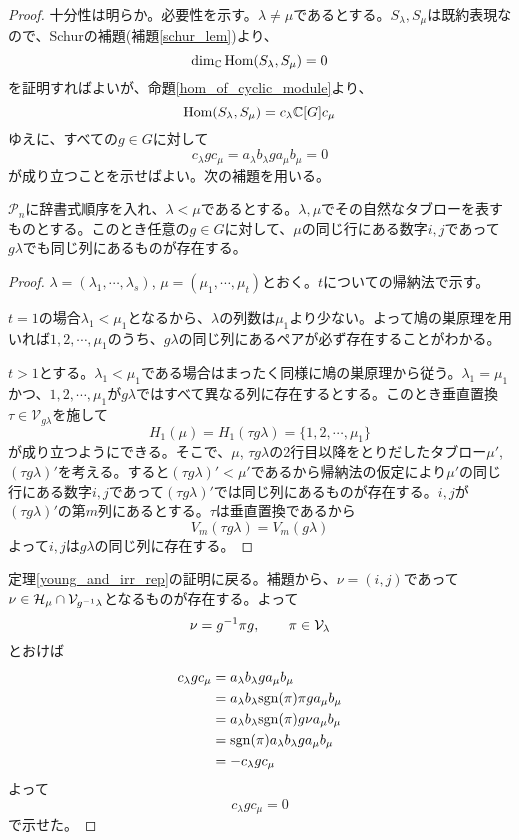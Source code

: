 \documentclass{ltjsreport}
\begin{document}
\begin{proof}
  十分性は明らか。必要性を示す。$\lambda\neq\mu$であるとする。$S_\lambda, S_\mu$は既約表現なので、Schurの補題(補題\ref{schur_lem})より、
  \[
  \dim_{\mathbb{C}}\text{Hom}(S_\lambda,S_\mu)=0  
  \]
  を証明すればよいが、命題\ref{hom_of_cyclic_module}より、
  \[
  \text{Hom}(S_\lambda,S_\mu)=c_\lambda\mathbb{C}[G]c_\mu
  \]
  ゆえに、すべての$g\in G$に対して
  \[
  c_\lambda gc_\mu  =a_\lambda b_\lambda g a_\mu b_\mu = 0
  \]
  が成り立つことを示せばよい。次の補題を用いる。
  \begin{lemm}\label{lexicographical}
    $\mathcal{P}_n$に辞書式順序を入れ、$\lambda < \mu$であるとする。$\lambda, \mu$でその自然なタブローを表すものとする。このとき任意の$g\in G$に対して、$\mu$の同じ行にある数字$i,j$であって$g\lambda$でも同じ列にあるものが存在する。
  \end{lemm}

  \begin{proof}
    $\lambda=(\lambda_1,\cdots,\lambda_s)$, $\mu=(\mu_1,\cdots,\mu_t)$とおく。$t$についての帰納法で示す。

    $t=1$の場合$\lambda_1<\mu_1$となるから、$\lambda$の列数は$\mu_1$より少ない。よって鳩の巣原理を用いれば$1,2,\cdots,\mu_1$のうち、$g\lambda$の同じ列にあるペアが必ず存在することがわかる。

    $t>1$とする。$\lambda_1<\mu_1$である場合はまったく同様に鳩の巣原理から従う。$\lambda_1=\mu_1$かつ、$1,2,\cdots,\mu_1$が$g\lambda$ではすべて異なる列に存在するとする。このとき垂直置換$\tau\in\mathcal{V}_{g\lambda}$を施して
    \[
    H_1(\mu)=H_1(\tau g\lambda)=\{1,2,\cdots,\mu_1\}  
    \]
    が成り立つようにできる。そこで、$\mu$, $\tau g\lambda$の2行目以降をとりだしたタブロー$\mu'$, $(\tau g\lambda)'$を考える。すると$(\tau g\lambda)'<\mu'$であるから帰納法の仮定により$\mu'$の同じ行にある数字$i,j$であって$(\tau g\lambda)'$では同じ列にあるものが存在する。$i,j$が$(\tau g\lambda)'$の第$m$列にあるとする。$\tau$は垂直置換であるから
    \[
    V_m(\tau g\lambda)=V_m(g\lambda)
    \]
    よって$i,j$は$g\lambda$の同じ列に存在する。
  \end{proof}

  定理\ref{young_and_irr_rep}の証明に戻る。補題から、$\nu=(i,j)$であって$\nu\in \mathcal{H}_\mu\cap\mathcal{V}_{g^{-1}\lambda}$となるものが存在する。よって
  \[
  \nu=g^{-1}\pi g,\qquad \pi\in \mathcal{V}_{\lambda}
  \]
  とおけば
  \begin{align*}
    c_\lambda g c_\mu
    &=a_\lambda b_\lambda g a_\mu b_\mu\\
    &=a_\lambda b_\lambda \mathrm{sgn}(\pi)\pi g a_\mu b_\mu\\
    &=a_\lambda b_\lambda \mathrm{sgn}(\pi)g\nu a_\mu b_\mu\\
    &=\mathrm{sgn}(\pi)a_\lambda b_\lambda g a_\mu b_\mu\\
    &=-c_\lambda g c_\mu
  \end{align*}
  よって
  \[
    c_\lambda g c_\mu=0
  \]
  で示せた。
\end{proof}
\end{document}
